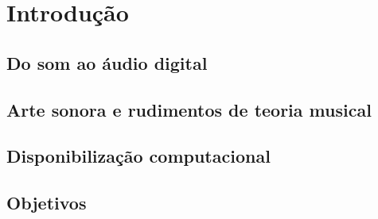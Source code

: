 \chapter{Introdução} %
\label{cap:intro} 

    \section{Do som ao áudio digital}

    \section{Arte sonora e rudimentos de teoria musical}

    \section{Disponibilização computacional}

    \section{Objetivos}
    \label{sec:objetivos}
